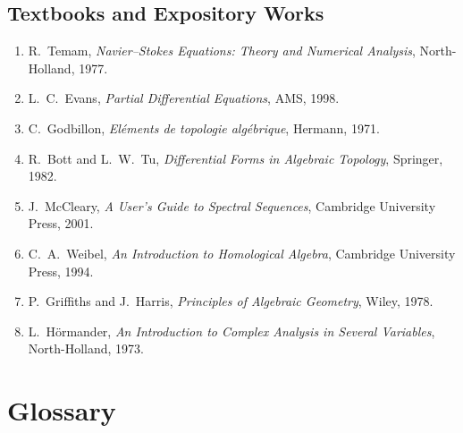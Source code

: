 \subsection*{Textbooks and Expository Works}
\begin{enumerate}
    \item R.\ Temam, \textit{Navier--Stokes Equations: Theory and Numerical Analysis}, North-Holland, 1977.
    \item L.\ C.\ Evans, \textit{Partial Differential Equations}, AMS, 1998.
    \item C.\ Godbillon, \textit{El{\'e}ments de topologie alg{\'e}brique}, Hermann, 1971.
    \item R.\ Bott and L.\ W.\ Tu, \textit{Differential Forms in Algebraic Topology}, Springer, 1982.
    \item J.\ McCleary, \textit{A User's Guide to Spectral Sequences}, Cambridge University Press, 2001.
    \item C.\ A.\ Weibel, \textit{An Introduction to Homological Algebra}, Cambridge University Press, 1994.
    \item P.\ Griffiths and J.\ Harris, \textit{Principles of Algebraic Geometry}, Wiley, 1978.
    \item L.\ H\"{o}rmander, \textit{An Introduction to Complex Analysis in Several Variables}, North-Holland, 1973.
\end{enumerate}

\section*{Glossary}

